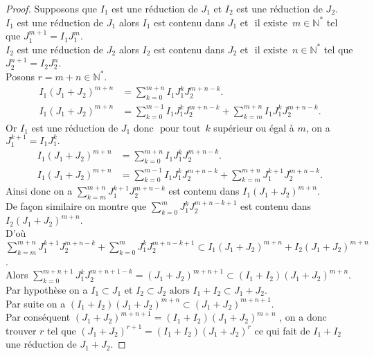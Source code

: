 \begin{proof}
	Supposons que $I_1$ est une réduction de $J_1$ et $I_2$ est une réduction de $J_2$.\\
	$I_1$ est une réduction de $J_1$ alors $I_1 $ est contenu dans $ J_1$ et $\text{ il existe } \, m \in \mathbb{N^*}$ tel que $J_1^{m+1} = I_1 J_1^m$.\\
	$I_2$ est une réduction de $J_2$ alors $I_2 $ est contenu dans $ J_2$ et $\text{ il existe } \, n \in \mathbb{N^*}$ tel que $J_2^{n+1} = I_2 J_2^n$.\\
	Posons $r=m+n \in \mathbb{N^*} $.\\
	\begin{align*}
		I_1(J_1+J_2)^{m+n}& = \displaystyle \sum_{k=0}^{m+n}{I_1 J_1^k J_2^{m+n-k}}.\\
		I_1(J_1+J_2)^{m+n}& = \displaystyle \sum_{k=0}^{m-1}{I_1 J_1^k J_2^{m+n-k}} + \displaystyle \sum_{k=m}^{m+n}{I_1 J_1^k J_2^{m+n-k}}.
	\end{align*}
	Or $I_1$ est une réduction de $J_1$ donc $\text{ pour tout } \, k$ supérieur ou égal à $ m$, on a \\ $J_1^{k+1} = I_1 J_1^{k}.$
	\begin{align*}
		I_1(J_1+J_2)^{m+n}& = \displaystyle \sum_{k=0}^{m+n}{I_1 J_1^k J_2^{m+n-k}}.\\
		I_1(J_1+J_2)^{m+n}& = \displaystyle \sum_{k=0}^{m-1}{I_1 J_1^k J_2^{m+n-k}} + \displaystyle \sum_{k=m}^{m+n}{J_1^{k+1} J_2^{m+n-k}}.
	\end{align*}
	Ainsi donc on a $\displaystyle \sum_{k=m}^{m+n}{J_1^{k+1} J_2^{m+n-k}} $ est contenu dans $  I_1(J_1+J_2)^{m+n}$.\\
	De façon similaire on montre que $\displaystyle \sum_{k=0}^{m}{J_1^{k} J_2^{m+n-k+1}} $ est contenu dans $  I_2(J_1+J_2)^{m+n}.$\\
	D'où $\displaystyle \sum_{k=m}^{m+n}{J_1^{k+1} J_2^{m+n-k}} + \displaystyle \sum_{k=0}^{m}{J_1^{k} J_2^{m+n-k+1}} \subset I_1(J_1+J_2)^{m+n} + I_2(J_1+J_2)^{m+n}$.\\ Alors $\displaystyle \sum_{k=0}^{m+n+1}{J_1^{k} J_2^{m+n+1-k}} = (J_1+J_2)^{m+n+1} \subset (I_1+I_2)(J_1+J_2)^{m+n}$.\\
	Par hypothèse on a $I_1 \subset J_1$ et $I_2 \subset J_2 \text{ alors } I_1+I_2 \subset J_1+J_2$.\\
	Par suite on a $(I_1+I_2)(J_1+J_2)^{m+n} \subset (J_1+J_2)^{m+n+1}$.\\ Par conséquent $(J_1+J_2)^{m+n+1} = (I_1+I_2)(J_1+J_2)^{m+n}$ , on a donc trouver $r$ tel que $(J_1+J_2)^{r+1} = (I_1+I_2)(J_1+J_2)^{r}$ ce qui fait de $I_1+I_2$  une réduction de $J_1+J_2$.
\end{proof}
